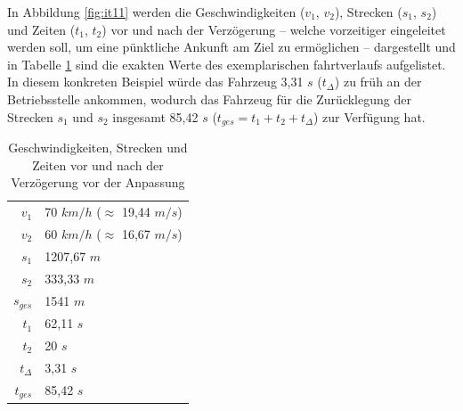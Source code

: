 In Abbildung \ref{fig:it11} werden die Geschwindigkeiten ($v_1$, $v_2$), Strecken ($s_1$, $s_2$) und Zeiten ($t_1$, $t_2$) vor und nach der Verzögerung -- welche vorzeitiger eingeleitet werden soll, um eine pünktliche Ankunft am Ziel zu ermöglichen -- dargestellt und in Tabelle \ref{table:speed_fine_tuning_ex} sind die exakten Werte des exemplarischen \Gls{fahrtverlauf}s aufgelistet. In diesem konkreten Beispiel würde das Fahrzeug 3,31 $s$ ($t_{\varDelta}$) zu früh an der Betriebsstelle ankommen, wodurch das Fahrzeug für die Zurücklegung der Strecken $s_1$ und $s_2$ insgesamt 85,42 $s$ ($t_{ges}=t_1+t_2+t_{\varDelta}$) zur Verfügung hat.
\begin{table}
\begin{center}
\renewcommand{\arraystretch}{1.2}
\begin{tabular}{r l}
$v_1$                   &   70 $km/h$ ($\approx$ 19,44 $m/s$)                         \\ 
$v_2$                   &   60 $km/h$ ($\approx$ 16,67 $m/s$)                         \\ 
$s_1$                   &   1207,67 $m$                         \\ 
$s_2$                   &   333,33 $m$                         \\ 
$s_{ges}$                   &   1541 $m$                         \\ 
$t_1$                   &   62,11 $s$                         \\ 
$t_2$                   &   20 $s$                         \\ 
$t_{\varDelta}$                   &   3,31 $s$                         \\ 
$t_{ges}$                   &   85,42 $s$                         \\ 
\end{tabular}
\renewcommand{\arraystretch}{1}
\caption{Geschwindigkeiten, Strecken und Zeiten vor und nach der Verzögerung vor der Anpassung}
\label{table:speed_fine_tuning_ex}
\end{center}
\end{table}

